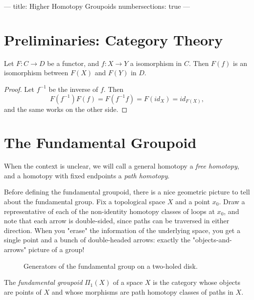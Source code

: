 ---
title: Higher Homotopy Groupoids
numbersections: true
---

\section{Preliminaries: Category Theory}


\begin{thm}\label{functors-preserve-isomorphism}
	Let $F: C\rightarrow D$ be a functor, and $f: X\rightarrow Y$ a isomorphism in $C$. Then $F(f)$ is an isomorphism between $F(X)$ and $F(Y)$ in $D$.
\end{thm}

\begin{proof}
	Let $f^{-1}$ be the inverse of $f$. Then $$F(f^{-1})F(f) = F(f^{-1}f) = F(id_X) = id_{F(X)},$$ and the same works on the other side.
\end{proof}




\section{The Fundamental Groupoid}
\label{The Fundamental Group}

\begin{notation}
	When the context is unclear, we will call a general homotopy a \emph{free
		homotopy}, and a homotopy with fixed endpoints a \emph{path homotopy}.
\end{notation}

Before defining the fundamental groupoid, there is a nice geometric picture to
tell about the fundamental group. Fix a topological space $X$ and a point
$x_0$. Draw a representative of each of the non-identity homotopy classes of
loops at $x_0$, and note that each arrow is double-sided, since paths can be
traversed in either direction. When you "erase" the information of the
underlying space, you get a single point and a bunch of double-headed arrows:
exactly the "objects-and-arrows" picture of a group!

\begin{figure}[H]
	\centering
	
	\caption{Generators of the fundamental group on a two-holed disk.}
	\label{fig:group}
\end{figure}


\begin{dfn}
	The \textit{fundamental groupoid} $\Pi_1(X)$ of a space $X$ is the category whose
	objects are points of $X$ and whose morphisms are path homotopy classes of
	paths in $X$.
\end{dfn}

